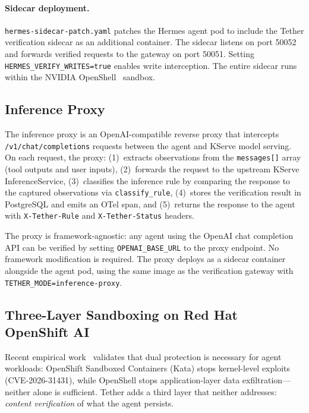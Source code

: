 \documentclass[sigplan,screen,nonacm]{acmart}
\begin{document}
\paragraph{Sidecar deployment.}
\texttt{hermes-sidecar-patch.yaml} patches the Hermes agent pod to include
the Tether verification sidecar as an additional container. The sidecar
listens on port 50052 and forwards verified requests to the gateway on port
50051. Setting \texttt{HERMES\_VERIFY\_WRITES=true} enables write
interception. The entire sidecar runs within the NVIDIA
OpenShell~\cite{nvidia2026openshell} sandbox.

\subsection{Inference Proxy}
\label{sec:proxy}

The inference proxy is an OpenAI-compatible reverse proxy that intercepts
\texttt{/v1/chat/completions} requests between the agent and KServe model
serving. On each request, the proxy: (1)~extracts observations from the
\texttt{messages[]} array (tool outputs and user inputs), (2)~forwards the
request to the upstream KServe InferenceService, (3)~classifies the
inference rule by comparing the response to the captured observations via
\texttt{classify\_rule}, (4)~stores the verification result in PostgreSQL
and emits an OTel span, and (5)~returns the response to the agent with
\texttt{X-Tether-Rule} and \texttt{X-Tether-Status} headers.

The proxy is framework-agnostic: any agent using the OpenAI chat completion
API can be verified by setting \texttt{OPENAI\_BASE\_URL} to the proxy
endpoint. No framework modification is required. The proxy deploys as a
sidecar container alongside the agent pod, using the same image as the
verification gateway with \texttt{TETHER\_MODE=inference-proxy}.

\subsection{Three-Layer Sandboxing on Red Hat OpenShift AI}
\label{sec:threelayer}

Recent empirical work~\cite{osc2026layered} validates that dual protection
is necessary for agent workloads: OpenShift Sandboxed Containers (Kata)
stops kernel-level exploits (CVE-2026-31431), while OpenShell stops
application-layer data exfiltration---neither alone is sufficient. Tether
adds a third layer that neither addresses: \emph{content verification} of
what the agent persists.
\end{document}
